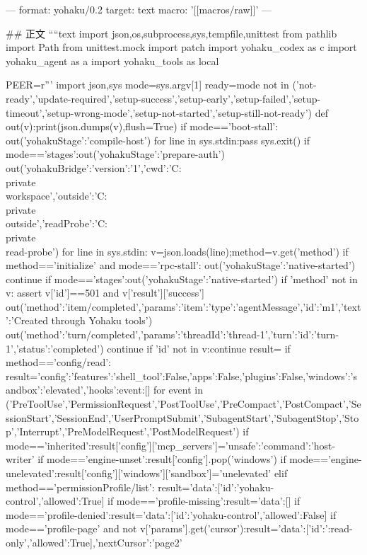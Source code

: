 ---
format: yohaku/0.2
target: text
macro: '[[macros/raw]]'
---

## 正文
````text
import json,os,subprocess,sys,tempfile,unittest
from pathlib import Path
from unittest.mock import patch
import yohaku_codex as c
import yohaku_agent as a
import yohaku_tools as local

PEER=r'''
import json,sys
mode=sys.argv[1]
ready=mode not in ('not-ready','update-required','setup-success','setup-early','setup-failed','setup-timeout','setup-wrong-mode','setup-not-started','setup-still-not-ready')
def out(v):print(json.dumps(v),flush=True)
if mode=='boot-stall':
 out({'yohakuStage':'compile-host'})
 for line in sys.stdin:pass
 sys.exit()
if mode=='stages':out({'yohakuStage':'prepare-auth'})
out({'yohakuBridge':{'version':'1','cwd':'C:\\private\\workspace','outside':'C:\\private\\outside','readProbe':'C:\\private\\read-probe'}})
for line in sys.stdin:
 v=json.loads(line);method=v.get('method')
 if method=='initialize' and mode=='rpc-stall':
  out({'yohakuStage':'native-started'})
  continue
 if mode=='stages':out({'yohakuStage':'native-started'})
 if 'method' not in v:
  assert v['id']==501 and v['result']['success']
  out({'method':'item/completed','params':{'item':{'type':'agentMessage','id':'m1','text':'Created through Yohaku tools'}}})
  out({'method':'turn/completed','params':{'threadId':'thread-1','turn':{'id':'turn-1','status':'completed'}}})
  continue
 if 'id' not in v:continue
 result={}
 if method=='config/read':
  result={'config':{'features':{'shell_tool':False,'apps':False,'plugins':False},'windows':{'sandbox':'elevated'},'hooks':{event:[] for event in ('PreToolUse','PermissionRequest','PostToolUse','PreCompact','PostCompact','SessionStart','SessionEnd','UserPromptSubmit','SubagentStart','SubagentStop','Stop','Interrupt','PreModelRequest','PostModelRequest')}}}
  if mode=='inherited':result['config']['mcp_servers']={'unsafe':{'command':'host-writer'}}
  if mode=='engine-unset':result['config'].pop('windows')
  if mode=='engine-unelevated':result['config']['windows']['sandbox']='unelevated'
 elif method=='permissionProfile/list':
  result={'data':[{'id':'yohaku-control','allowed':True}]}
  if mode=='profile-missing':result={'data':[]}
  if mode=='profile-denied':result={'data':[{'id':'yohaku-control','allowed':False}]}
  if mode=='profile-page' and not v['params'].get('cursor'):result={'data':[{'id':':read-only','allowed':True}],'nextCursor':'page2'}
